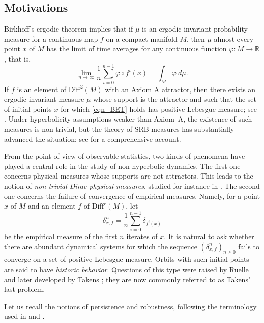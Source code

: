 \documentclass{amsart}
\theoremstyle{definition}
\numberwithin{equation}{section}
\numberwithin{figure}{section}
\begin{document}
\subsection{Motivations}\label{ss_motivation}
Birkhoff's ergodic theorem implies that if 
$\mu$ is 
an ergodic invariant probability measure
for a continuous map $f$ on a compact manifold $M$, 
then
$\mu$-almost every point $x$ of $M$ has the limit of 
time averages for any continuous function $\varphi:M\longrightarrow \mathbb{R}$, that is, 
\begin{equation}\label{eqn_BET}
\lim_{n\rightarrow \infty} \frac{1}{n}
\sum_{i=0}^{n-1}
\varphi\circ f^{i}(x)=\int_{M}\varphi\ d\mu.
\end{equation}
If $f$ is an element of $\mathrm{Diff}^{2}(M)$ with an Axiom A attractor, then there exists 
an ergodic invariant measure $\mu$ whose support is the attractor and such that
the set of initial points $x$ for which \eqref{eqn_BET} holds has positive Lebesgue measure; 
see \cite{Si72,R76,Bo08}. 
Under hyperbolicity assumptions weaker than Axiom~A, 
the existence of such measures is non-trivial, but the theory of SRB measures has substantially advanced the situation; 
see \cite{BDV05} for a comprehensive account.

From the point of view of observable statistics, two kinds of phenomena have played a central role in the study of non-hyperbolic dynamics. The first one concerns physical measures whose supports are not attractors. This leads to the notion of \emph{non-trivial Dirac physical measures}, studied for instance in \cite{CV01, SSV10, SV13, Sa18, GGS22}. The second one concerns the failure of convergence of empirical measures. Namely, for a point $x$ of $M$ and an element $f$ of $\mathrm{Diff}^{r}(M)$, let
\begin{equation}\label{af}
\delta^{n}_{x,f}=
\frac{1}{n}\sum_{i=0}^{n-1}\delta_{f^i(x)}
\end{equation}
be the empirical measure of the first $n$ iterates of $x$. It is natural to ask whether there are abundant dynamical systems for which the sequence $(\delta^n_{x,f})_{n\geq 0}$ fails to converge on a set of positive Lebesgue measure. Orbits with such initial points are said to have \emph{historic behavior}. Questions of this type were raised by Ruelle and later developed by Takens \cite{R01,T08}; they are now commonly referred to as Takens' last problem.

Let us recall the notions of persistence and robustness, following the terminology used in \cite[Section 11]{PR83} and \cite[Section 3]{T08}.
\end{document}

